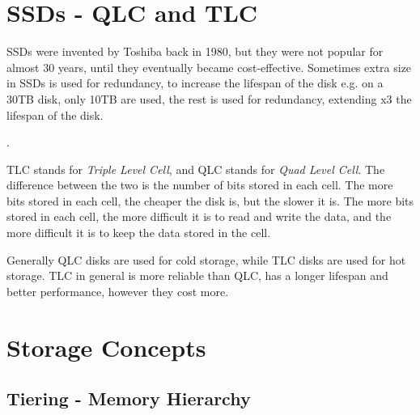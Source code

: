       
\section{SSDs - QLC and TLC}
SSDs were invented by Toshiba back in 1980, but they were not popular for almost 30 years, until they eventually became cost-effective. Sometimes extra size in SSDs is used for redundancy, to increase the lifespan of the disk e.g. on a 30TB disk, only 10TB are used, the rest is used for redundancy, extending x3 the lifespan of the disk.

.

TLC stands for \textit{Triple Level Cell}, and QLC stands for \textit{Quad Level Cell}. The difference between the two is the number of bits stored in each cell. The more bits stored in each cell, the cheaper the disk is, but the slower it is. The more bits stored in each cell, the more difficult it is to read and write the data, and the more difficult it is to keep the data stored in the cell.

Generally QLC disks are used for cold storage, while TLC disks are used for hot storage.
TLC in general is more reliable than QLC, has a longer lifespan and better performance, however they cost more.

\section{Storage Concepts}
\subsection{Tiering - Memory Hierarchy}

